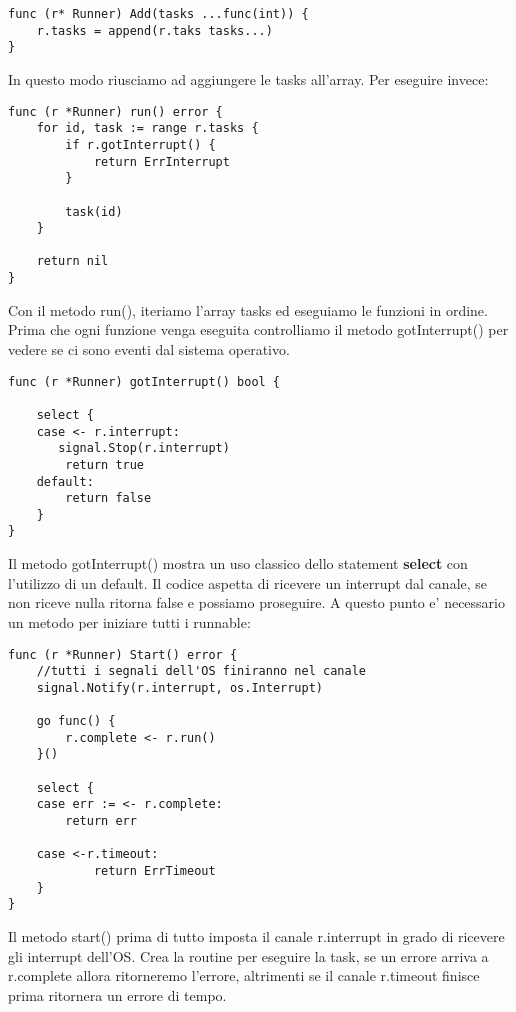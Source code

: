\begin{lstlisting}
func (r* Runner) Add(tasks ...func(int)) {
    r.tasks = append(r.taks tasks...)
}
\end{lstlisting}

In questo modo riusciamo ad aggiungere le tasks all'array. Per eseguire invece:

\begin{lstlisting}
func (r *Runner) run() error {
    for id, task := range r.tasks {
        if r.gotInterrupt() {
            return ErrInterrupt
        }
        
        task(id)
    }
    
    return nil
}
\end{lstlisting}

Con il metodo run(), iteriamo l'array tasks ed eseguiamo le funzioni in ordine. Prima che ogni funzione venga eseguita controlliamo il metodo gotInterrupt() per vedere se ci sono eventi dal sistema operativo.

\begin{lstlisting}
func (r *Runner) gotInterrupt() bool {

    select {
    case <- r.interrupt:
       signal.Stop(r.interrupt)
        return true
    default:
        return false
    }
}
\end{lstlisting}

Il metodo gotInterrupt() mostra un uso classico dello statement \textbf{select} con l'utilizzo di un default. Il codice aspetta di ricevere un interrupt dal canale, se non riceve nulla ritorna false e possiamo proseguire. \newline 
A questo punto e' necessario un metodo per iniziare tutti i runnable:

\begin{lstlisting}
func (r *Runner) Start() error {
    //tutti i segnali dell'OS finiranno nel canale
    signal.Notify(r.interrupt, os.Interrupt)
    
    go func() {
        r.complete <- r.run()
    }()
    
    select {
    case err := <- r.complete:
        return err
    
    case <-r.timeout:
            return ErrTimeout
    }
}
\end{lstlisting}

Il metodo start() prima di tutto imposta il canale r.interrupt in grado di ricevere gli interrupt dell'OS. Crea la routine per eseguire la task, se un errore arriva a r.complete allora ritorneremo l'errore, altrimenti se il canale r.timeout finisce prima ritornera un errore di tempo.